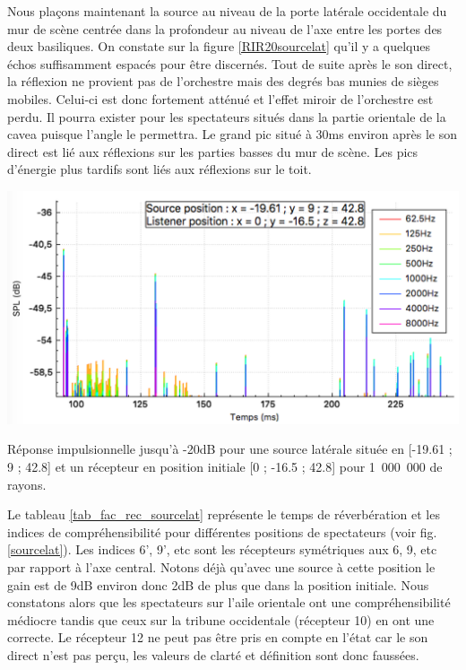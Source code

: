 Nous plaçons maintenant la source au niveau de la porte latérale occidentale du mur de scène centrée dans la profondeur au niveau de l'axe entre les portes des deux \glspl{basilique}. On constate sur la figure \ref{RIR20sourcelat} qu'il y a quelques échos suffisamment espacés pour être discernés. Tout de suite après le son direct, la réflexion ne provient pas de l'orchestre mais des degrés bas munies de sièges mobiles. Celui-ci est donc fortement atténué et l'effet miroir de l'orchestre est perdu. Il pourra exister pour les spectateurs situés dans la partie orientale de la \gls{cavea} puisque l'angle le permettra. Le grand pic situé à 30ms environ après le son direct est lié aux réflexions sur les parties basses du mur de scène. Les pics d'énergie plus tardifs sont liés aux réflexions sur le toit.
%
\begin{figureth}
	\includegraphics[width=0.7\linewidth]{images/RIR20sourcelat}
	\caption{Réponse impulsionnelle jusqu'à -20dB pour une source latérale située en [-19.61 ; 9 ; 42.8] et un récepteur en position initiale [0 ; -16.5 ; 42.8] pour 1~000~000 de rayons.}
	\label{RIR20sourcelat}
\end{figureth}
%
Le tableau \ref{tab_fac_rec_sourcelat} représente le temps de réverbération et les indices de compréhensibilité pour différentes positions de spectateurs (voir fig. \ref{sourcelat}). Les indices 6', 9', etc sont les récepteurs symétriques aux 6, 9, etc par rapport à l'axe central. Notons déjà qu'avec une source à cette position le gain est de 9dB environ donc 2dB de plus que dans la position initiale. Nous constatons alors que les spectateurs sur l'aile orientale ont une compréhensibilité médiocre tandis que ceux sur la tribune occidentale (récepteur 10) en ont une correcte. Le récepteur 12 ne peut pas être pris en compte en l'état car le son direct n'est pas perçu, les valeurs de clarté et définition sont donc faussées.

